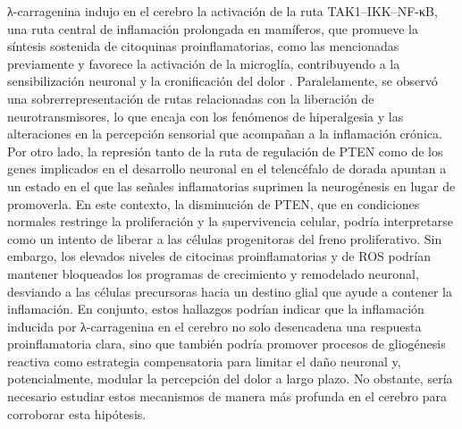 \documentclass[10pt,a4paper]{article}
\begin{document}
λ-carragenina indujo en el cerebro la activación de la ruta TAK1–IKK–NF-κB, una ruta central de inflamación prolongada en mamíferos, que promueve la síntesis sostenida de citoquinas proinflamatorias, como las mencionadas previamente y favorece la activación de la microglía, contribuyendo a la sensibilización neuronal y la cronificación del dolor \parencite{Sun2022}. Paralelamente, se observó una sobrerrepresentación de rutas relacionadas con la liberación de neurotransmisores, lo que encaja con los fenómenos de hiperalgesia y las alteraciones en la percepción sensorial que acompañan a la inflamación crónica. Por otro lado, la represión tanto de la ruta de regulación de PTEN como de los genes implicados en el desarrollo neuronal en el telencéfalo de dorada apuntan a un estado en el que las señales inflamatorias suprimen la neurogénesis en lugar de promoverla. En este contexto, la disminución de PTEN, que en condiciones normales restringe la proliferación y la supervivencia celular, podría interpretarse como un intento de liberar a las células progenitoras del freno proliferativo. Sin embargo, los elevados niveles de citocinas proinflamatorias y de ROS podrían mantener bloqueados los programas de crecimiento y remodelado neuronal, desviando a las células precursoras hacia un destino glial que ayude a contener la inflamación. En conjunto, estos hallazgos podrían indicar que la inflamación inducida por λ-carragenina en el cerebro no solo desencadena una respuesta proinflamatoria clara, sino que también podría promover procesos de gliogénesis reactiva como estrategia compensatoria para limitar el daño neuronal y, potencialmente, modular la percepción del dolor a largo plazo. No obstante, sería necesario estudiar estos mecanismos de manera más profunda en el cerebro para corroborar esta hipótesis.
\end{document}
